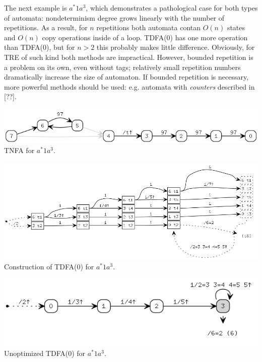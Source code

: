 \documentclass{article}
\theoremstyle{definition}
\begin{document}
\begin{multicols}{2}
The next example is $a^* 1 a^{3}$,
which demonstrates a pathological case for both types of automata:
nondeterminism degree grows linearly with the number of repetitions.
As a result, for $n$ repetitions both automata contan $O(n)$ states and $O(n)$ copy operations inside of a loop.
TDFA(0) has one more operation than TDFA(0), but for $n \!>\! 2$ this probably makes little difference.
Obviously, for TRE of such kind both methods are impractical.
However, bounded repetition is a problem on its own, even without tags;
relatively small repetition numbers dramatically increase the size of automaton.
If bounded repetition is necessary, more powerful methods should be used:
e.g. automata with \emph{counters} described in [??].
\begin{center}
\includegraphics[width=\linewidth]{img/example3/tnfa.png}\\
\footnotesize{TNFA for $a^* 1 a^{3}$.} \\
\end{center}
\begin{center}
\includegraphics[width=\linewidth]{img/example3/tdfa0_raw.png}\\
\footnotesize{Construction of TDFA(0) for $a^* 1 a^{3}$.} \\
\end{center}
\begin{center}
\includegraphics[width=0.8\linewidth]{img/example3/tdfa0.png}\\
\footnotesize{Unoptimized TDFA(0) for $a^* 1 a^{3}$.} \\

\end{center}
\end{multicols}
\end{document}
